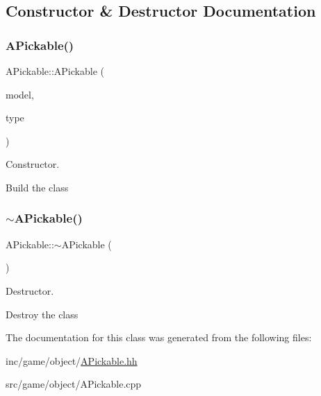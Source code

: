\subsection{Constructor \& Destructor Documentation}
\mbox{\label{classAPickable_a2dbcad766785636f50cd116d057975fc}} 
\subsubsection{\texorpdfstring{A\+Pickable()}{APickable()}}
{\footnotesize\ttfamily A\+Pickable\+::\+A\+Pickable (\begin{DoxyParamCaption}\item[{const std\+::shared\+\_\+ptr$<$ \hyperlink{classModel3d}{Model3d} $>$ \&}]{model,  }\item[{indie\+::object\+Type}]{type }\end{DoxyParamCaption})}



Constructor. 

Build the class \mbox{\label{classAPickable_a145013963070158596ad2e0d07065f5d}} 
\subsubsection{\texorpdfstring{$\sim$\+A\+Pickable()}{~APickable()}}
{\footnotesize\ttfamily A\+Pickable\+::$\sim$\+A\+Pickable (\begin{DoxyParamCaption}{ }\end{DoxyParamCaption})}



Destructor. 

Destroy the class 

The documentation for this class was generated from the following files\+:\begin{DoxyCompactItemize}
\item 
inc/game/object/\hyperlink{APickable_8hh}{A\+Pickable.\+hh}\item 
src/game/object/A\+Pickable.\+cpp\end{DoxyCompactItemize}
